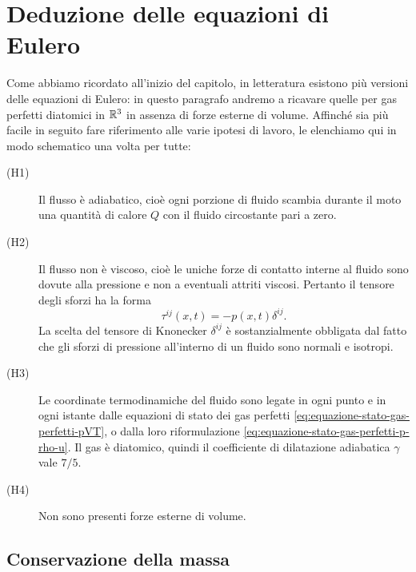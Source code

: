 


\section{Deduzione delle equazioni di Eulero}

Come abbiamo ricordato all'inizio del capitolo,
in letteratura esistono più versioni delle equazioni di Eulero:
in questo paragrafo andremo a ricavare quelle per gas perfetti
diatomici in $\mathbb{R}^3$ in assenza di forze esterne di volume.
Affinché sia più facile in seguito fare riferimento alle varie
ipotesi di lavoro, le elenchiamo qui in modo schematico una volta per tutte:
\begin{description}
\item[(H1)] Il flusso è adiabatico, cioè ogni porzione di fluido
	scambia durante il moto una quantità di calore $Q$ con il
	fluido circostante pari a zero.
\item[(H2)] Il flusso non è viscoso, cioè le uniche forze di contatto
	interne al fluido sono dovute alla pressione e non a eventuali
	attriti viscosi. Pertanto il tensore degli sforzi ha la forma
	\[
	\tau^{ij}(x,t) = -p(x,t)\delta^{ij}.
	\]
	La scelta del tensore di Knonecker $\delta^{ij}$ è sostanzialmente
	obbligata dal fatto che gli sforzi di pressione all'interno di un fluido
	sono normali e isotropi.
\item[(H3)] Le coordinate termodinamiche del fluido sono legate in ogni punto
	 e in ogni istante dalle equazioni di stato dei gas perfetti
	 \eqref{eq:equazione-stato-gas-perfetti-pVT}, o dalla loro
	 riformulazione \eqref{eq:equazione-stato-gas-perfetti-p-rho-u}.
	 Il gas è diatomico, quindi il coefficiente di dilatazione adiabatica
	 $\gamma$ vale $7/5$.
\item[(H4)] Non sono presenti forze esterne di volume.
\end{description}

\subsection*{Conservazione della massa}

